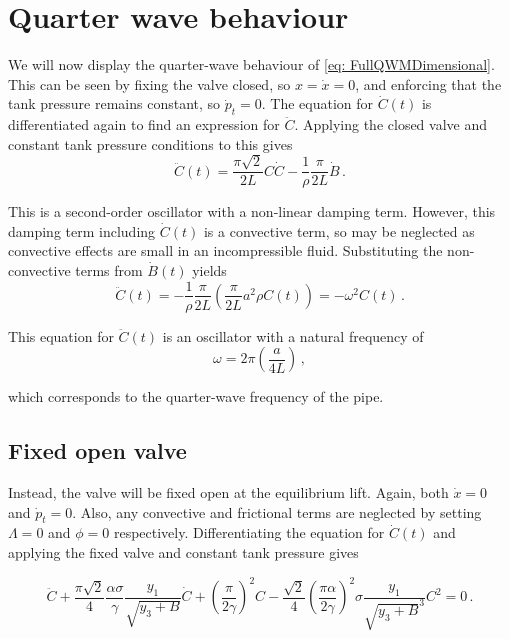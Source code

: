 \section{Quarter wave behaviour} \label{sec: QWBehaviour}

We will now display the quarter-wave behaviour of \cref{eq: FullQWMDimensional}. This can be seen by fixing the valve closed, so $x = \dot{x} = 0$, and enforcing that the tank pressure remains constant, so $\dot{p}_t = 0$. The  equation for $\dot{C}(t)$ is differentiated again to find an expression for $\ddot{C}$. Applying the closed valve and constant tank pressure conditions to this gives
~
\begin{equation*}
    \ddot{C}(t) = \frac{\pi \sqrt{2}}{2 L} C \dot{C} - \frac{1}{\rho} \frac{\pi}{2 L} \dot{B} \, .
\end{equation*}

This is a second-order oscillator with a non-linear damping term. However, this damping term including $\dot{C}(t)$ is a convective term, so may be neglected as convective effects are small in an incompressible fluid. Substituting the non-convective terms from $\dot{B}(t)$ yields
~
\begin{equation*}
    \ddot{C}(t) = - \frac{1}{\rho} \frac{\pi}{2 L} \left( \frac{\pi}{2L} a^2 \rho C(t) \right) = - \omega^2 C(t) \, .
\end{equation*}

This equation for $\ddot{C}(t)$ is an oscillator with a natural frequency of
~
\begin{equation*}
    \omega = 2 \pi \left( \frac{a}{4 L} \right) \, ,
\end{equation*}

which corresponds to the quarter-wave frequency of the pipe.

\subsection{Fixed open valve}

Instead, the valve will be fixed open at the equilibrium lift. Again, both $\dot{x} = 0$ and $\dot{p}_t = 0$. Also, any convective and frictional terms are neglected by setting $\Lambda = 0$ and $\phi = 0$ respectively. Differentiating the equation for $\dot{C}(t)$ and applying the fixed valve and constant tank pressure gives

\begin{equation*}
    \ddot{C} + \frac{\pi \sqrt{2}}{4} \frac{\alpha \sigma}{\gamma} \frac{y_1}{\sqrt{y_3 + B}} \dot{C} + \left( \frac{\pi}{2 \gamma} \right)^2 C - \frac{\sqrt{2}}{4} \left( \frac{\pi \alpha}{2 \gamma} \right)^2 \sigma \frac{y_1}{\sqrt{y_3 + B}^3} C^2 = 0 \, .
\end{equation*}

